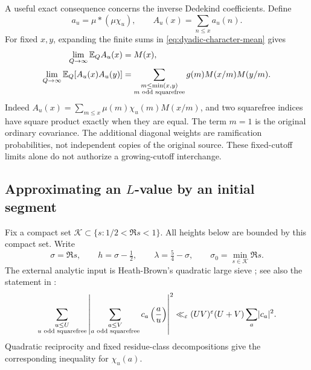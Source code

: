 A useful exact consequence concerns the inverse Dedekind coefficients. Define
\[
 a_u=\mu*(\mu\chi_u),\qquad A_u(x)=\sum_{n\le x}a_u(n).
\]
For fixed $x,y$, expanding the finite sums in \eqref{eq:dyadic-character-mean} gives
\begin{align}
 \lim_{Q\to\infty}\mathbb E_Q A_u(x)&=M(x),\label{eq:mean-Mertens}\\
 \lim_{Q\to\infty}\mathbb E_Q[A_u(x)A_u(y)]
 &=\sum_{\substack{m\le\min(x,y)\\m\text{ odd squarefree}}}
       g(m)M(x/m)M(y/m).\label{eq:cov-Mertens}
\end{align}
Indeed $A_u(x)=\sum_{m\le x}\mu(m)\chi_u(m)M(x/m)$, and two squarefree indices have square product exactly when they are equal. The term $m=1$ is the original ordinary covariance. The additional diagonal weights are ramification probabilities, not independent copies of the original source. These fixed-cutoff limits alone do not authorize a growing-cutoff interchange.

\subsection{Approximating an \texorpdfstring{$L$}{L}-value by an initial segment}
Fix a compact set $\mathcal K\subset\{s:1/2<\Re s<1\}$. All heights below are bounded by this compact set. Write
\[
 \sigma=\Re s,\qquad h=\sigma-\tfrac12,\qquad
 \lambda=\tfrac54-\sigma,\qquad \sigma_0=\min_{s\in\mathcal K}\Re s.
\]
The external analytic input is Heath-Brown's quadratic large sieve \cite{HB95}; see also the statement in \cite[Theorem 2.4]{SY10}:
\begin{equation}\label{eq:quadratic-LS}
 \sum_{\substack{u\le U\\u\text{ odd squarefree}}}
 \left|\sum_{\substack{a\le V\\a\text{ odd squarefree}}}
        c_a\left(\frac au\right)\right|^2
 \ll_\varepsilon (UV)^\varepsilon(U+V)\sum_a\lvert c_a\rvert^2.
\end{equation}
Quadratic reciprocity and fixed residue-class decompositions give the corresponding inequality for $\chi_u(a)$.


